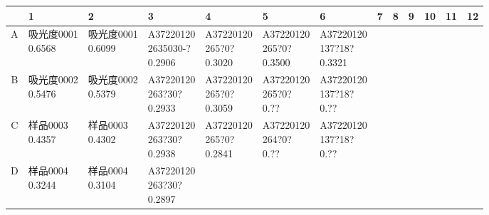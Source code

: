 \documentclass[UTF8,10pt,a4paper,fontset=fandol]{ctexart}
\begin{document}
\begin{center}
\scriptsize
\setlength{\tabcolsep}{2pt}
\begin{tabular}{|c|*{12}{p{0.58cm}|}}
\hline
 & 1 & 2 & 3 & 4 & 5 & 6 & 7 & 8 & 9 & 10 & 11 & 12\\
\hline
A &
\shortstack{吸光度0001\\0.6568} &
\shortstack{吸光度0001\\0.6099} &
\shortstack{A37220120\\2635030-?\\0.2906} &
\shortstack{A37220120\\265?0?\\0.3020} &
\shortstack{A37220120\\265?0?\\0.3500} &
\shortstack{A37220120\\137?18?\\0.3321} &
& & & & &\\
\hline
B &
\shortstack{吸光度0002\\0.5476} &
\shortstack{吸光度0002\\0.5379} &
\shortstack{A37220120\\263?30?\\0.2933} &
\shortstack{A37220120\\265?0?\\0.3059} &
\shortstack{A37220120\\265?0?\\0.??} &
\shortstack{A37220120\\137?18?\\0.??} &
& & & & &\\
\hline
C &
\shortstack{样品0003\\0.4357} &
\shortstack{样品0003\\0.4302} &
\shortstack{A37220120\\263?30?\\0.2938} &
\shortstack{A37220120\\265?0?\\0.2841} &
\shortstack{A37220120\\264?0?\\0.??} &
\shortstack{A37220120\\137?18?\\0.??} &
& & & & &\\
\hline
D &
\shortstack{样品0004\\0.3244} &
\shortstack{样品0004\\0.3104} &
\shortstack{A37220120\\263?30?\\0.2897} &

\end{tabular}
\end{center}
\end{document}

